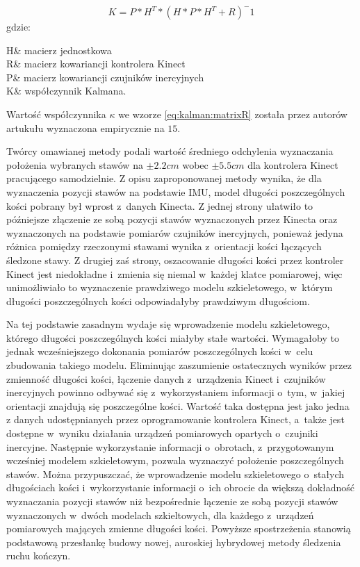 \begin{equation}
	K = P * H^T * (H * P * H^T +R)^-1
	\label{eq:kalman:gain}
\end{equation}
gdzie:
\begin{conditions}
	H& macierz jednostkowa\\
	R& macierz kowariancji kontrolera Kinect\\
	P& macierz kowariancji czujników inercyjnych\\
	K& współczynnik Kalmana.
\end{conditions}
																																																			
Wartość współczynnika $\kappa$ we wzorze \ref{eq:kalman:matrixR} została przez autorów artukułu wyznaczona empirycznie na $15$.
																																																			
Twórcy omawianej metody podali wartość średniego odchylenia wyznaczania położenia wybranych stawów na $\pm 2.2cm$ wobec $\pm 5.5cm$ dla kontrolera Kinect pracującego samodzielnie. Z opisu zaproponowanej metody wynika, że dla wyznaczenia pozycji stawów na podstawie IMU, model długości poszczególnych kości pobrany był wprost z~danych Kinecta. Z jednej strony ułatwiło to późniejsze złączenie ze sobą pozycji stawów wyznaczonych przez Kinecta oraz wyznaczonych na podstawie pomiarów czujników inercyjnych, ponieważ jedyna różnica pomiędzy rzeczonymi stawami wynika z~orientacji kości łączących śledzone stawy. Z drugiej zaś strony, oszacowanie długości kości przez kontroler Kinect jest niedokładne i~zmienia się niemal w~każdej klatce pomiarowej, więc unimożliwiało to wyznaczenie prawdziwego modelu szkieletowego, w~którym długości poszczególnych kości odpowiadałyby prawdziwym długościom.
				
Na tej podstawie zasadnym wydaje się wprowadzenie modelu szkieletowego, którego długości poszczególnych kości miałyby stałe wartości. Wymagałoby to jednak wcześniejszego dokonania pomiarów poszczególnych kości w~celu zbudowania takiego modelu. Eliminując zaszumienie ostatecznych wyników przez zmienność długości kości, łączenie danych z~urządzenia Kinect i~czujników inercyjnych powinno odbywać się z~wykorzystaniem informacji o~tym, w~jakiej orientacji znajdują się poszczególne kości. Wartość taka dostępna jest jako jedna z danych udostępnianych przez oprogramowanie kontrolera Kinect, a~także jest dostępne w~wyniku działania urządzeń pomiarowych opartych o~czujniki inercyjne. Następnie wykorzystanie informacji o~obrotach, z~przygotowanym wcześniej modelem szkieletowym, pozwala wyznaczyć położenie poszczególnych stawów. Można przypuszczać, że wprowadzenie modelu szkieletowego o~stałych długościach kości i~wykorzystanie informacji o~ich obrocie da większą dokładność wyznaczania pozycji stawów niż bezpośrednie łączenie ze sobą pozycji stawów wyznaczonych w~dwóch modelach szkieltowych, dla każdego z~urządzeń pomiarowych mających zmienne długości kości. Powyższe spostrzeżenia stanowią podstawową przesłankę budowy nowej, auroskiej hybrydowej metody śledzenia ruchu kończyn.